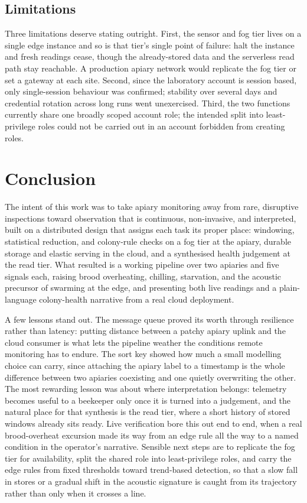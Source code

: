 \documentclass[conference]{IEEEtran}
\begin{document}
\subsection{Limitations}

Three limitations deserve stating outright. First, the sensor and fog tier lives on a single edge instance and so is that tier's single point of failure: halt the instance and fresh readings cease, though the already-stored data and the serverless read path stay reachable. A production apiary network would replicate the fog tier or set a gateway at each site. Second, since the laboratory account is session based, only single-session behaviour was confirmed; stability over several days and credential rotation across long runs went unexercised. Third, the two functions currently share one broadly scoped account role; the intended split into least-privilege roles could not be carried out in an account forbidden from creating roles.

\section{Conclusion}

The intent of this work was to take apiary monitoring away from rare, disruptive inspections toward observation that is continuous, non-invasive, and interpreted, built on a distributed design that assigns each task its proper place: windowing, statistical reduction, and colony-rule checks on a fog tier at the apiary, durable storage and elastic serving in the cloud, and a synthesised health judgement at the read tier. What resulted is a working pipeline over two apiaries and five signals each, raising brood overheating, chilling, starvation, and the acoustic precursor of swarming at the edge, and presenting both live readings and a plain-language colony-health narrative from a real cloud deployment.

A few lessons stand out. The message queue proved its worth through resilience rather than latency: putting distance between a patchy apiary uplink and the cloud consumer is what lets the pipeline weather the conditions remote monitoring has to endure. The sort key showed how much a small modelling choice can carry, since attaching the apiary label to a timestamp is the whole difference between two apiaries coexisting and one quietly overwriting the other. The most rewarding lesson was about where interpretation belongs: telemetry becomes useful to a beekeeper only once it is turned into a judgement, and the natural place for that synthesis is the read tier, where a short history of stored windows already sits ready. Live verification bore this out end to end, when a real brood-overheat excursion made its way from an edge rule all the way to a named condition in the operator's narrative. Sensible next steps are to replicate the fog tier for availability, split the shared role into least-privilege roles, and carry the edge rules from fixed thresholds toward trend-based detection, so that a slow fall in stores or a gradual shift in the acoustic signature is caught from its trajectory rather than only when it crosses a line.



\end{document}
